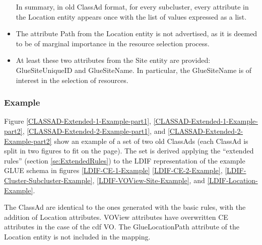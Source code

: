 \documentclass[12pt]{article}
\begin{document}
\begin{itemize}
In summary, in old ClassAd format, for every subcluster, every
attribute in the Location entity appears once with the list of
values expressed as a list.

\item The attribute Path from the Location entity is not advertised, as it is
deemed to be of marginal importance in the resource selection process.

\item At least these two attributes from the Site entity are provided: 
GlueSiteUniqueID and GlueSiteName. In particular, the GlueSiteName is of
interest in the selection of resources. 

\end{itemize}

\subsubsection{Example}
\label{se:ExtendedRulesExample}

Figure \ref{CLASSAD-Extended-1-Example-part1},
\ref{CLASSAD-Extended-1-Example-part2},
\ref{CLASSAD-Extended-2-Example-part1}, and
\ref{CLASSAD-Extended-2-Example-part2}  show an example of a set of
two old ClassAds (each ClassAd is split in two figures to fit on the
page). The set is derived applying the ``extended rules'' (section
\ref{se:ExtendedRules}) to the LDIF representation of the example
GLUE schema in figures \ref{LDIF-CE-1-Example}
\ref{LDIF-CE-2-Example}, \ref{LDIF-Cluster-Subcluster-Example},
\ref{LDIF-VOView-Site-Example}, and \ref{LDIF-Location-Example}.

The ClassAd are identical to the ones generated with the basic
rules, with the addition of Location attributes. VOView attributes
have overwritten CE attributes in the case of the cdf VO. The
GlueLocationPath attribute of the Location entity is not included in
the mapping.
\end{document}
